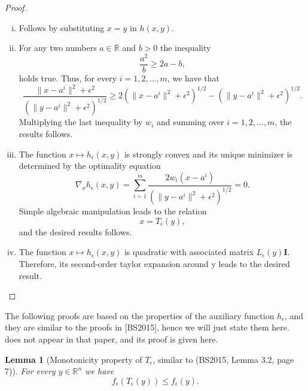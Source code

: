 \documentclass[11pt]{article}
\numberwithin{equation}{section}
\newtheorem{lemma}{Lemma}[proposition]
\begin{document}
\begin{proof}
\begin{enumerate}[(i)]
	\item Follows by substituting $x=y$ in $h(x,y)$.
	\item For any two numbers $a \in \mathbb{R}$ and $b>0$ the inequality 
	\begin{equation*}
		\frac{a^2}{b} \geq 2a - b ,
	\end{equation*}
	holds true. Thus, for every $i=1,2, \ldots ,m$, we have that
	\begin{equation*}
		\frac{\|x-a^i\|^2 + {\epsilon}^2}{\left( \|y-a^i\|^2 + {\epsilon}^2 \right)^{1/2}} \geq 2\left( \|x-a^i\|^2 + {\epsilon}^2 \right)^{1/2} - \left( \|y-a^i\|^2 + {\epsilon}^2 \right)^{1/2} .
	\end{equation*}
	Multiplying the last inequality by $w_i$ and summing over $i=1,2, \ldots, m$, the results follows. 
	\item The function $x \mapsto h_{\epsilon}(x,y)$ is strongly convex and its unique minimizer is determined by the optimality equation
	\begin{equation*}
		\nabla_x h_{\epsilon}(x,y) = \sum\limits_{i=1}^m \frac{2w_i \left( x-a^i \right) }{\left( \|y-a^i\|^2 + {\epsilon}^2 \right)^{1/2}} = 0 .
	\end{equation*}
	Simple algebraic manipulation leads to the relation
	\begin{equation*}
		x = T_{\epsilon}(y) ,
	\end{equation*}
	and the desired results follows.
	\item The function $x \mapsto h_{\epsilon}(x,y)$ is quadratic with associated matrix $L_{\epsilon}(y)\textbf{I}$. Therefore, its second-order taylor expansion around y leads to the desired result.
\end{enumerate}
\end{proof}

The following proofs are based on the properties of the auxiliary function $h_{\epsilon}$, and they are similar to the proofs in [BS2015], hence we will just state them here.  does not appear in that paper, and its proof is given here.

\begin{lemma}[Monotonicity property of $T_{\epsilon}$, similar to  (BS2015, Lemma 3.2, page 7)] For every $y \in \mathbb{R}^n$ we have
\begin{equation*}
	f_{\epsilon}(T_{\epsilon}(y)) \leq f_{\epsilon}(y).
\end{equation*}
\end{lemma}
\end{document}
